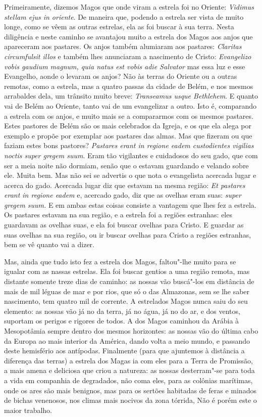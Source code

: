 Primeiramente, dizemos Magos que onde viram a estrela foi no Oriente:
\emph{Vidimus stellam ejus in oriente}. De maneira que,
podendo a estrela ser vista de muito longe, como se vêem as outras
estrelas, ela as foi buscar à sua terra. Nesta diligência e neste
caminho se avantajou muito a estrela dos Magos aos anjos que apareceram
aos pastares. Os anjos também alumiaram aos pastares: \emph{Claritas
circumfulsit illos} e também lhes anunciaram a nascimento de
Cristo: \emph{Evangelizo vobis gaudium magnum, quia natus est vobis adie Salvator} mas essa luz e esse
Evangelho, aonde o levaram os anjos? Não às terras do Oriente ou a
outras remotas, como a estrela, mas a quatro passas da cidade de Belém,
e nos mesmos arrabaldes dela, um trânsito muito breve: \emph{Transeamus
usque Bethlehem}. E quanto vai de Belém ao Oriente, tanto
vai de um evangelizar a outro. Isto é, comparando a estrela com os
anjos, e muito mais se a compararmos com os mesmos pastares. Estes
pastores de Belém são os mais celebrados da Igreja, e os que ela alega
por exemplo e propõe por exemplar aos pastares das almas. Mas que
fizeram ou que faziam estes bons pastores? \emph{Pastares erant in
regione eadem custodientes vigilias noctis super gregem suum}.
Eram tão vigilantes e cuidadosos do seu gado, que com ser a
meia noite não dormiam, senão que o estavam guardando e velando sobre
ele. Muita bem. Mas não sei se advertis o que nota o evangelista
acercada lugar e acerca do gado. Acercada lugar diz que estavam na mesma
região: \emph{Et pastares erant in regione eadem} e, acercado gado, diz
que as ovelhas eram suas: \emph{super gregem suum.} E em ambas estas
coisas consiste a vantagem que lhes fez a estrela. Os pastares estavam
na sua região, e a estrela foi a regiões estranhas: eles guardavam as
ovelhas suas, e ela foi buscar ovelhas para Cristo. E guardar as suas
ovelhas na sua região, ou ir buscar ovelhas para Cristo a regiões
estranhas, bem se vê quanto vai a dizer.

Mas, ainda que tudo isto fez a estrela dos Magos, faltou"-lhe muito para
se igualar com as nassas estrelas. Ela foi buscar gentios a uma região
remota, mas distante somente treze dias de caminho: as nossas vão
buscá"-los em distância de mais de mil léguas de mar e por rios, que só o
das Almazonas, sem se lhe saber nascimento, tem quatro mil de corrente.
A estrelados Magos nunca saiu do seu elemento: as nossas vão já no da
terra, já no água, já no do ar, e dos ventos, suportam os perigos e
rigores de todos. A dos Magos caminhou da Arábia à Mesopotâmia sempre
dentro dos mesmos horizontes: as nossas vão do última cabo da Europa ao
mais interior da América, dando volta a meio mundo, e passando deste
hemisfério aos antípodas. Finalmente (para que ajuntemos à distância a
diferença das terras) a estrela dos Magas ia com eles para a Terra de
Promissão, a mais amena e deliciosa que criou a natureza: as nossas
desterram"-se para toda a vida em companhia de degradados, não coma eles,
para as colônias marítimas, onde os ares são mais benignos, mas para os
sertões habitadas de feras e minados de bichas venenosos, nos climas
mais nocivos da zona tórrida, Não é porém este o maior trabalho.

